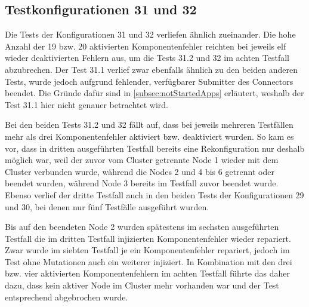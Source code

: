 \subsection{Testkonfigurationen 31 und 32}
\label{subsec:noReconf3132}

Die Tests der Konfigurationen 31 und 32 verliefen ähnlich zueinander.
Die hohe Anzahl der 19 bzw. 20 aktivierten Komponentenfehler reichten bei jeweils elf wieder deaktivierten Fehlern aus, um die Tests 31.2 und 32 im achten Testfall abzubrechen.
Der Test 31.1 verlief zwar ebenfalls ähnlich zu den beiden anderen Tests, wurde jedoch aufgrund fehlender, verfügbarer Submitter des Connectors beendet.
Die Gründe dafür sind in \cref{subsec:notStartedApps} erläutert, weshalb der Test 31.1 hier nicht genauer betrachtet wird.

Bei den beiden Tests 31.2 und 32 fällt auf, dass bei jeweils mehreren Testfällen mehr als drei Komponentenfehler aktiviert bzw. deaktiviert wurden.
So kam es vor, dass \zB in dritten ausgeführten Testfall bereits eine Rekonfiguration nur deshalb möglich war, weil der zuvor vom Cluster getrennte Node 1 wieder mit dem Cluster verbunden wurde, während die Nodes 2 und 4 bis 6 getrennt oder beendet wurden, während Node 3 bereits im Testfall zuvor beendet wurde.
Ebenso verlief der dritte Testfall auch in den beiden Tests der Konfigurationen 29 und 30, bei denen nur fünf Testfälle ausgeführt wurden.

Bis auf den beendeten Node 2 wurden spätestens im sechsten ausgeführten Testfall die im dritten Testfall injizierten Komponentenfehler wieder repariert.
Zwar wurde im siebten Testfall je ein Komponentenfehler repariert, jedoch im Test ohne Mutationen auch ein weiterer injiziert.
In Kombination mit den drei bzw. vier aktivierten Komponentenfehlern im achten Testfall führte das daher dazu, dass kein aktiver Node im Cluster mehr vorhanden war und der Test entsprechend abgebrochen wurde.

